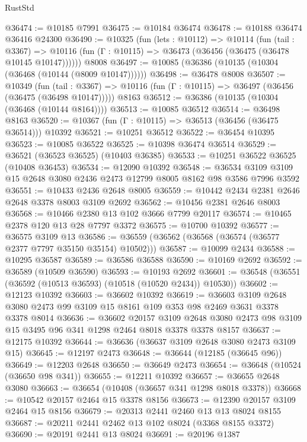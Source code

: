 \begin{lexlean}{RustStd}
\begin{coremodule}
@36474 := @10185 @7991
@36475 := @10184 @36474
@36478 := @10188 @36474 @36416 @24300
@36490 := @10325
    (fun (lets : @10112) =>
    @10114
      (fun (tail : @3367) =>
      @10116 (fun (Γ : @10115) => @36473 (@36456 (@36475 (@36478 @10145 @10147))))))
    @8008
@36497 := @10085 (@36386 (@10135 (@10304 (@36468 (@10144 (@8009 @10147))))))
@36498 := @36478 @8008
@36507 := @10349
    (fun (tail : @3367) => @10116 (fun (Γ : @10115) => @36497 (@36456 (@36475 (@36498 @10147)))))
    @8163
@36512 := @36386 (@10135 (@10304 (@36468 (@10144 @8164))))
@36513 := @10085 @36512
@36514 := @36498 @8163
@36520 := @10367 (fun (Γ : @10115) => @36513 (@36456 (@36475 @36514))) @10392
@36521 := @10251 @36512
@36522 := @36454 @10395
@36523 := @10085 @36522
@36525 := @10398 @36474 @36514
@36529 := @36521 (@36523 @36525) (@10403 @36385)
@36533 := @10251 @36522 @36525 (@10408 @36453)
@36534 := @12090 @10392
@36548 := @36534 @3109 @3109 @15 @2648 @3080 @2436 @2473 @12799 @8005 @8162 @98 @3586 @7996 @3592
@36551 := @10433 @2436 @2648 @8005
@36559 := @10442 @2434 @2381 @2646 @2648 @3378 @8003 @3109 @2692
@36562 := @10456 @2381 @2646 @8003
@36568 := @10466 @2380 @13 @102 @3666 @7799 @20117
@36574 := @10465 @2378 @120 @13 @28 @7797 @3372
@36575 := @10700 @10392
@36577 := @36575 @3109 @13
@36586 := @36559 (@36562 (@36568 (@36574 (@36577 @2377 @7797 @35150 @35154) @10502)))
@36587 := @10099 @2434
@36588 := @10295 @36587
@36589 := @36586 @36588
@36590 := @10169 @2692
@36592 := @36589 (@10509 @36590)
@36593 := @10193 @2692
@36601 := @36548 (@36551 (@36592 (@10513 @36593) (@10518 (@10520 @2434)) @10530))
@36602 := @12123 @10392
@36603 := @36602 @10392
@36619 := @36603
    @3109
    @2648
    @3080
    @2473
    @99
    @3109
    @15
    @8161
    @109
    @353
    @98
    @2469
    @3631
    @3378
    @3378
    @8014
@36636 := @36602
    @20157
    @3109
    @2648
    @3080
    @2473
    @98
    @3109
    @15
    @3495
    @96
    @341
    @1298
    @2464
    @8018
    @3378
    @3378
    @8157
@36637 := @12175 @10392
@36644 := @36636 (@36637 @3109 @2648 @3080 @2473 @3109 @15)
@36645 := @12197 @2473
@36648 := @36644 (@12185 (@36645 @96))
@36649 := @12203 @2648
@36650 := @36649 @2473
@36654 := @36648 (@10524 (@36650 @98 @341))
@36655 := @12211 @10392
@36657 := @36655 @2648 @3080
@36663 := @36654 (@10408 (@36657 @341 @1298 @8018 @3378))
@36668 := @10542 @20157 @2464 @15 @3378 @8156
@36673 := @12390 @20157 @3109 @2464 @15 @8156
@36679 := @20313 @2441 @2460 @13 @13 @8024 @8155
@36687 := @20211 @2441 @2462 @13 @102 @8024 (@3368 @8155 @3372)
@36690 := @20191 @2441 @13 @8024
@36691 := @20196 @1387

\end{coremodule}
\end{lexlean}
